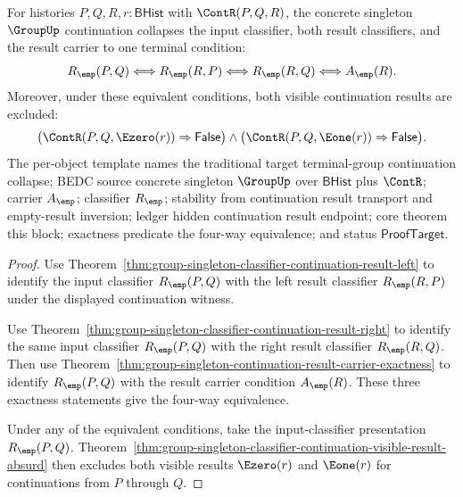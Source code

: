 \begin{theorem}
\label{thm:group-singleton-continuation-terminal-collapse}
For histories $P,Q,R,r:\mathsf{BHist}$ with $\ContR(P,Q,R)$, the concrete
singleton $\GroupUp$ continuation collapses the input classifier, both result
classifiers, and the result carrier to one terminal condition:
$$
R_{\emp}(P,Q)\Longleftrightarrow
R_{\emp}(R,P)\Longleftrightarrow
R_{\emp}(R,Q)\Longleftrightarrow
A_{\emp}(R).
$$
Moreover, under these equivalent conditions, both visible continuation results
are excluded:
$$
\bigl(\ContR(P,Q,\Ezero(r))\Rightarrow\mathsf{False}\bigr)\land
\bigl(\ContR(P,Q,\Eone(r))\Rightarrow\mathsf{False}\bigr).
$$
The per-object template names the traditional target terminal-group
continuation collapse; BEDC source concrete singleton $\GroupUp$ over
$\mathsf{BHist}$ plus $\ContR$; carrier $A_{\emp}$; classifier $R_{\emp}$;
stability from continuation result transport and empty-result inversion; ledger
hidden continuation result endpoint; core theorem this block; exactness
predicate the four-way equivalence; and status $\mathsf{ProofTarget}$.
\end{theorem}
\begin{proof}
Use Theorem~\ref{thm:group-singleton-classifier-continuation-result-left} to
identify the input classifier $R_{\emp}(P,Q)$ with the left result classifier
$R_{\emp}(R,P)$ under the displayed continuation witness.

Use Theorem~\ref{thm:group-singleton-classifier-continuation-result-right} to
identify the same input classifier $R_{\emp}(P,Q)$ with the right result
classifier $R_{\emp}(R,Q)$. Then use
Theorem~\ref{thm:group-singleton-continuation-result-carrier-exactness} to identify
$R_{\emp}(P,Q)$ with the result carrier condition $A_{\emp}(R)$. These three
exactness statements give the four-way equivalence.

Under any of the equivalent conditions, take the input-classifier presentation
$R_{\emp}(P,Q)$. Theorem~\ref{thm:group-singleton-classifier-continuation-visible-result-absurd}
then excludes both visible results $\Ezero(r)$ and $\Eone(r)$ for continuations
from $P$ through $Q$.
\end{proof}

